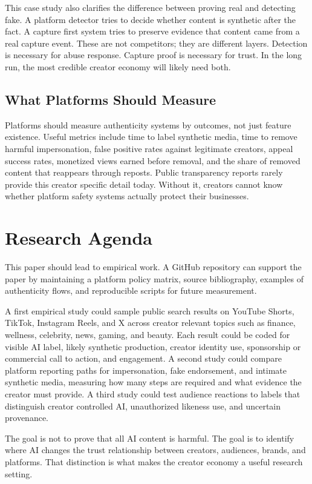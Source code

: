 \documentclass[11pt]{article}
\begin{document}
This case study also clarifies the difference between proving real and detecting fake. A platform detector tries to decide whether content is synthetic after the fact. A capture first system tries to preserve evidence that content came from a real capture event. These are not competitors; they are different layers. Detection is necessary for abuse response. Capture proof is necessary for trust. In the long run, the most credible creator economy will likely need both.

\subsection{What Platforms Should Measure}

Platforms should measure authenticity systems by outcomes, not just feature existence. Useful metrics include time to label synthetic media, time to remove harmful impersonation, false positive rates against legitimate creators, appeal success rates, monetized views earned before removal, and the share of removed content that reappears through reposts. Public transparency reports rarely provide this creator specific detail today. Without it, creators cannot know whether platform safety systems actually protect their businesses.

\section{Research Agenda}

This paper should lead to empirical work. A GitHub repository can support the paper by maintaining a platform policy matrix, source bibliography, examples of authenticity flows, and reproducible scripts for future measurement.

A first empirical study could sample public search results on YouTube Shorts, TikTok, Instagram Reels, and X across creator relevant topics such as finance, wellness, celebrity, news, gaming, and beauty. Each result could be coded for visible AI label, likely synthetic production, creator identity use, sponsorship or commercial call to action, and engagement. A second study could compare platform reporting paths for impersonation, fake endorsement, and intimate synthetic media, measuring how many steps are required and what evidence the creator must provide. A third study could test audience reactions to labels that distinguish creator controlled AI, unauthorized likeness use, and uncertain provenance.

The goal is not to prove that all AI content is harmful. The goal is to identify where AI changes the trust relationship between creators, audiences, brands, and platforms. That distinction is what makes the creator economy a useful research setting.
\end{document}
